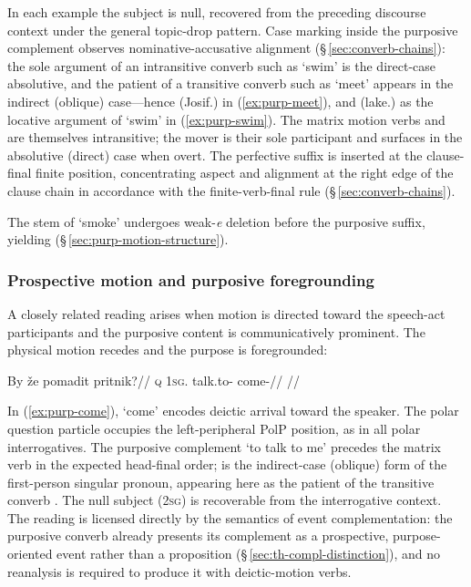 In each example the subject is null, recovered from the preceding discourse
context under the general topic-drop pattern. Case marking inside the purposive
complement observes nominative-accusative alignment
(§\,\ref{sec:converb-chains}): the sole argument of an intransitive converb such
as  `swim' is the direct-case absolutive, and the patient of a
transitive converb such as  `meet' appears in the indirect (oblique)
case---hence  (Josif.\Ind{}) in (\ref{ex:purp-meet}), and
 (lake.\Ind{}) as the locative argument of `swim' in
(\ref{ex:purp-swim}). The matrix motion verbs  and  are
themselves intransitive; the mover is their sole participant and surfaces in the
absolutive (direct) case when overt. The perfective suffix  is
inserted at the clause-final finite position, concentrating aspect and alignment
at the right edge of the clause chain in accordance with the finite-verb-final
rule (§\,\ref{sec:converb-chains}).

The stem of  `smoke' undergoes weak-\textit{e} deletion before the
purposive suffix, yielding  (§\,\ref{sec:purp-motion-structure}).

\subsubsection{Prospective motion and purposive
foregrounding}\label{sec:purp-motion-prospective}

A closely related reading arises when motion is directed toward the speech-act
participants and the purposive content is communicatively prominent. The
physical motion recedes and the purpose is foregrounded:

\ex\label{ex:purp-come}
\begingl
\gla By že pomadit pritnik?//
\glb \textsc{q} \textsc{1sg}.\Ind{} talk.to-\Purp{} come-\Pf{}//
\glft {}//
\endgl
\xe

In (\ref{ex:purp-come}),  `come' encodes deictic arrival toward the
speaker. The polar question particle  occupies the left-peripheral PolP
position, as in all polar interrogatives. The purposive complement  `to talk to me' precedes the matrix verb in the expected head-final
order;  is the indirect-case (oblique) form of the first-person singular
pronoun, appearing here as the patient of the transitive converb .
The null subject (\textsc{2sg}) is recoverable from the interrogative context.
The reading is licensed directly by the semantics of event complementation: the
purposive converb already presents its complement as a prospective,
purpose-oriented event rather than a proposition
(§\,\ref{sec:th-compl-distinction}), and no reanalysis is required to produce it
with deictic-motion verbs.

